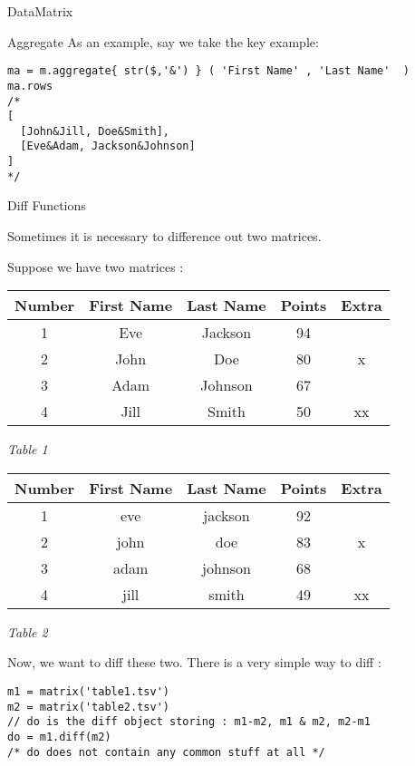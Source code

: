 \begin{section}{DataMatrix}
\begin{subsection}{Aggregate}
As an example, say we take the key example:

\begin{lstlisting}[style=JexlStyle]
ma = m.aggregate{ str($,'&') } ( 'First Name' , 'Last Name'  )
ma.rows 
/* 
[ 
  [John&Jill, Doe&Smith], 
  [Eve&Adam, Jackson&Johnson]
] 
*/
\end{lstlisting}
\end{subsection}


\begin{subsection}{Diff Functions}

Sometimes it is necessary to difference out two matrices.

Suppose we have two matrices :

\begin{center}\label{matrix-diff}

\begin{tabular}{ |c|c|c|c|c| } 
 \hline
 Number	& First Name & Last Name & Points & Extra \\ 
 \hline 
   1    & Eve	     & Jackson	& 94      & \\
   2    & John       &  Doe	    & 80      &  x \\ 
   3    & Adam       & Johnson	& 67      &  \\	
   4    & Jill       & Smith	& 50      & xx \\  
 \hline  
\end{tabular}

\emph{ Table 1 }


\begin{tabular}{ |c|c|c|c|c| } 
 \hline
 Number	& First Name & Last Name & Points & Extra \\ 
 \hline 
   1    & eve	     & jackson	& 92      & \\
   2    & john       & doe	    & 83      &  x \\ 
   3    & adam       & johnson	& 68      &  \\	
   4    & jill       & smith	& 49      & xx \\  
 \hline
\end{tabular}

\emph{ Table 2 }

\end{center}

Now, we want to diff these two. There is a very simple way to diff :

\begin{lstlisting}[style=JexlStyle]
m1 = matrix('table1.tsv')
m2 = matrix('table2.tsv')
// do is the diff object storing : m1-m2, m1 & m2, m2-m1 
do = m1.diff(m2)
/* do does not contain any common stuff at all */
\end{lstlisting}


\end{subsection}
\end{section}
